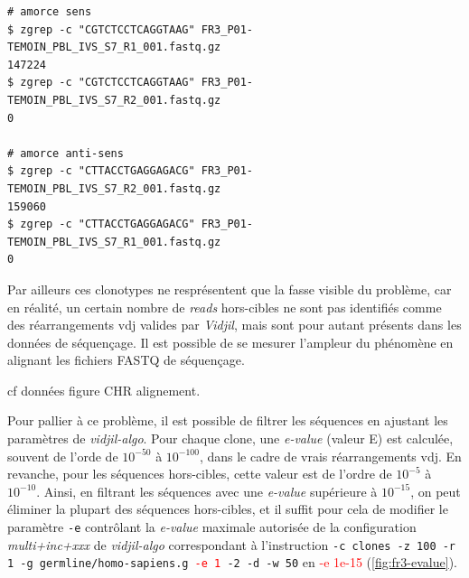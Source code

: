 \begin{lstlisting}[language=custombash, 
    caption={Commande Bash et résultat de la recherche des séquences des amorces dans les fichiers FASTQ R1 et R2.},
    label={lst:bash-primer-r1-r2},
basicstyle=\ttfamily\small]
# amorce sens
$ zgrep -c "CGTCTCCTCAGGTAAG" FR3_P01-TEMOIN_PBL_IVS_S7_R1_001.fastq.gz
147224
$ zgrep -c "CGTCTCCTCAGGTAAG" FR3_P01-TEMOIN_PBL_IVS_S7_R2_001.fastq.gz
0

# amorce anti-sens
$ zgrep -c "CTTACCTGAGGAGACG" FR3_P01-TEMOIN_PBL_IVS_S7_R2_001.fastq.gz
159060
$ zgrep -c "CTTACCTGAGGAGACG" FR3_P01-TEMOIN_PBL_IVS_S7_R1_001.fastq.gz
0
\end{lstlisting}

\vspace{1em}
    
Par ailleurs ces clonotypes ne resprésentent que la fasse visible du problème, car en réalité, un certain nombre de \textit{reads} 
hors-cibles ne sont pas identifiés comme des réarrangements \gls{vdj} valides par \textit{Vidjil}, mais sont pour autant présents 
dans les données de séquençage. Il est possible de  se mesurer l'ampleur du phénomène en alignant les fichiers FASTQ de séquençage.

\vspace{1em}

cf données figure CHR alignement.

\vspace{1em}

Pour pallier à ce problème, il est possible de filtrer les séquences en ajustant les paramètres de \textit{vidjil-algo}.
Pour chaque clone, une \textit{e-value} (valeur E) est calculée, souvent de l'orde de $10^{-50}$ à $10^{-100}$, dans le 
cadre de vrais réarrangements \gls{vdj}. En revanche, pour les séquences hors-cibles, cette valeur est de l'ordre de $10^{-5}$ à $10^{-10}$. 
Ainsi, en filtrant les séquences avec une \textit{e-value} supérieure à $10^{-15}$, on peut éliminer la plupart des séquences hors-cibles, et 
il suffit pour cela de modifier le paramètre \texttt{-e} contrôlant la \textit{e-value} maximale autorisée de la configuration \textit{multi+inc+xxx} 
de \textit{vidjil-algo} correspondant à l'instruction \texttt{-c clones -z 100 -r 1 -g germline/homo-sapiens.g \textcolor{red}{-e 1} -2 -d -w 50} 
en \textcolor{red}{-e 1e-15} (\autoref{fig:fr3-evalue}).

